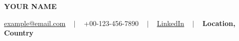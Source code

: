 \begin{center}
	\textbf{\LARGE YOUR NAME} %
\end{center}
\vspace{-0.2cm}
\begin{center}
	\href{mailto:example@email.com}{example@email.com} ~ $ | $ ~ +00-123-456-7890 ~ $ | $  ~ \href{https://www.linkedin.com/in/yourid/}{LinkedIn} ~ $ | $ ~ \textbf{Location, Country}
\end{center}
\vspace{-0.5cm}